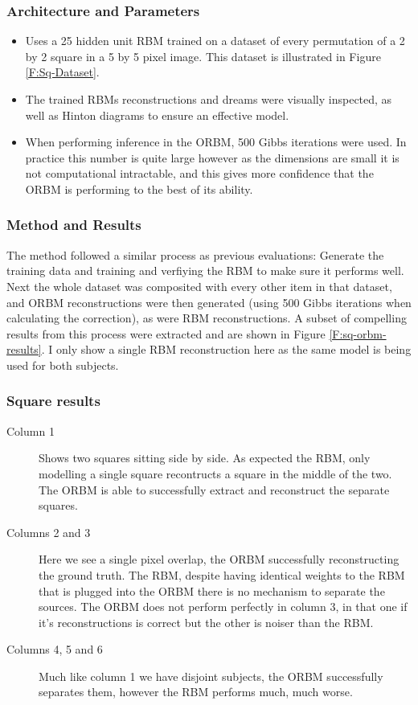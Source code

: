 \subsubsection{Architecture and Parameters}
\begin{itemize}
  \item Uses a 25 hidden unit RBM trained on a dataset of every permutation of a 2 by 2 square in a 5 by 5 pixel image. This dataset is illustrated in Figure \ref{F:Sq-Dataset}.
  \item The trained RBMs reconstructions and dreams were visually inspected, as well as Hinton diagrams to ensure an effective model.
  \item When performing inference in the ORBM, 500 Gibbs iterations were used. In practice this number is quite large however as the dimensions are small it is not computational intractable, and this gives more confidence that the ORBM is performing to the best of its ability.
\end{itemize}

\subsubsection{Method and Results}

The method followed a similar process as previous evaluations: Generate the training data and training and verfiying the RBM to make sure it performs well.
Next the whole dataset was composited with every other item in that dataset, and ORBM reconstructions were then generated (using 500 Gibbs iterations when calculating the correction), as were RBM reconstructions.
A subset of compelling results from this process were extracted and are shown in Figure \ref{F:sq-orbm-results}. I only show a single RBM reconstruction here as the same model is being used for both subjects.

\subsubsection{Square results}
\begin{description}
  \item[Column 1] Shows two squares sitting side by side. As expected the RBM, only modelling a single square recontructs a square in the middle of the two. The ORBM is able to successfully extract and reconstruct the separate squares.
  \item[Columns 2 and 3] Here we see a single pixel overlap, the ORBM successfully reconstructing the ground truth. The RBM, despite having identical weights to the RBM that is plugged into the ORBM there is no mechanism to separate the sources. The ORBM does not perform perfectly in column 3, in that one if it's reconstructions is correct but the other is noiser than the RBM.
  \item[Columns 4, 5 and 6] Much like column 1 we have disjoint subjects, the ORBM successfully separates them, however the RBM performs much, much worse.
\end{description}

